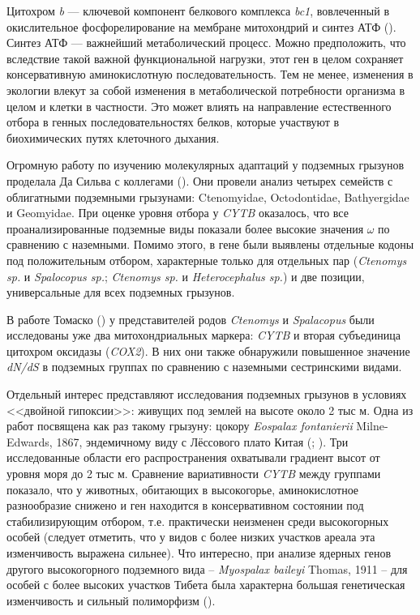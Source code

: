 Цитохром \textit{b} --- ключевой компонент белкового комплекса \textit{bc1}, вовлеченный в окислительное фосфорелирование на мембране митохондрий и синтез АТФ (\cite{Tomasco2014}). Синтез АТФ --- важнейший метаболический процесс. Можно предположить, что вследствие такой важной функциональной нагрузки, этот ген в целом сохраняет консервативную аминокислотную последовательность. Тем не менее, изменения в экологии влекут за собой изменения в метаболической потребности организма в целом и клетки в частности. Это может влиять на направление естественного отбора в генных последовательностях белков, которые участвуют в биохимических путях клеточного дыхания.

Огромную работу по изучению молекулярных адаптаций у подземных грызунов проделала Да Сильва с коллегами (\cite{DaSilva2009}). Они провели анализ четырех семейств с облигатными подземными грызунами: Ctenomyidae, Octodontidae, Bathyergidae и Geomyidae. При оценке уровня отбора у \textit{CYTB} оказалось, что все проанализированные подземные виды показали более высокие значения $\omega$ по сравнению с наземными. Помимо этого, в гене были выявлены отдельные кодоны под положительным отбором, характерные только для отдельных пар (\textit{Ctenomys sp.} и \textit{Spalocopus sp.}; \textit{Ctenomys sp.} и \textit{Heterocephalus sp.}) и две позиции, универсальные для всех подземных грызунов.

В работе Томаско (\cite{Tomasco2014}) у представителей родов \textit{Ctenomys} и \textit{Spalacopus} были исследованы уже два митохондриальных маркера: \textit{CYTB} и вторая субъединица цитохром оксидазы (\textit{COX2}). В них они также обнаружили повышенное значение \textit{dN/dS} в подземных группах по сравнению с наземными сестринскими видами.

Отдельный интерес представляют исследования подземных грызунов в условиях <<двойной гипоксии>>: живущих под землей на высоте около 2 тыс м. Одна из работ посвящена как раз такому грызуну: цокору \textit{Eospalax fontanierii} Milne-Edwards, 1867, эндемичному виду с Лёссового плато Китая (\cite{Zhang2013a}; \cite{Li1989}). Три исследованные области его распространения охватывали градиент высот от уровня моря до 2 тыс м. Сравнение вариативности \textit{CYTB} между группами показало, что у животных, обитающих в высокогорье, аминокислотное разнообразие снижено и ген находится в консервативном состоянии под стабилизирующим отбором, т.е. практически неизменен среди высокогорных особей (следует отметить, что у видов с более низких участков ареала эта изменчивость выражена сильнее). Что интересно, при анализе ядерных генов другого высокогорного подземного вида -- \textit{Myospalax baileyi} Thomas, 1911 -- для особей с более высоких участков Тибета была характерна большая генетическая изменчивость и сильный полиморфизм (\cite{Cai2018}).

